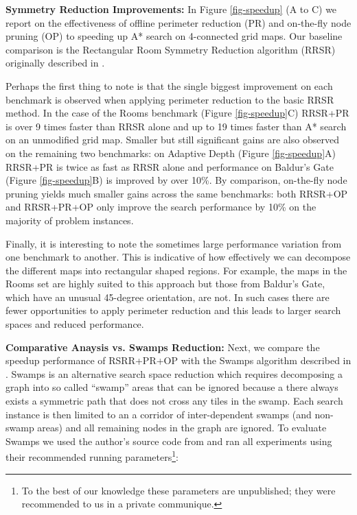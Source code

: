 \textbf{Symmetry Reduction Improvements: }
In Figure \ref{fig-speedup} (A to C) we report on the  
effectiveness of offline perimeter reduction (PR) and on-the-fly 
node pruning (OP) to speeding up A* search on 4-connected grid maps.
Our baseline comparison is the Rectangular Room Symmetry Reduction algorithm 
(RRSR) originally described in \cite{harabor10}.
\par
Perhaps the first thing to note is that the single biggest improvement on each
benchmark is observed when applying perimeter reduction to the basic RRSR method.
In the case of the Rooms benchmark (Figure \ref{fig-speedup}C) RRSR+PR is over 9
times faster than RRSR alone and up to 19 times faster than A* search on an unmodified
grid map.
Smaller but still significant gains are also observed on the remaining two benchmarks:
on Adaptive Depth (Figure \ref{fig-speedup}A) RRSR+PR is twice as fast as RRSR alone
and performance on Baldur's Gate (Figure \ref{fig-speedup}B) is improved by over 10\%.
By comparison, on-the-fly node pruning yields much smaller gains across the same benchmarks:
both RRSR+OP and RRSR+PR+OP only improve the search performance by 10\% on the majority
of problem instances.
\par
Finally, it is interesting to note the sometimes large performance variation 
from one benchmark to another. This is indicative of how effectively we can 
decompose the different maps into rectangular shaped regions.
For example, the maps in the Rooms set are highly suited to this approach but those
from Baldur's Gate, which have an unusual 45-degree orientation, are not.
In such cases there are fewer opportunities to apply perimeter reduction and this 
leads to larger search spaces and reduced performance. 
\par
\textbf{Comparative Anaysis vs. Swamps Reduction:}
Next, we compare the speedup performance of RSRR+PR+OP with the Swamps algorithm 
described in \cite{pochter10}. Swamps is an alternative search space reduction 
which requires decomposing a graph into so called ``swamp'' areas that can be 
ignored because a there always exists a symmetric path that does not cross any 
tiles in the swamp. 
Each search instance is then limited to an a corridor of inter-dependent 
swamps (and non-swamp areas) and all remaining nodes in the graph are ignored.
To evaluate Swamps we used the author's source code from \cite{pochter10} and
ran all experiments using their recommended running parameters\footnote{To the best of our knowledge 
these parameters are unpublished; they were recommended to us in a private communique.}:
